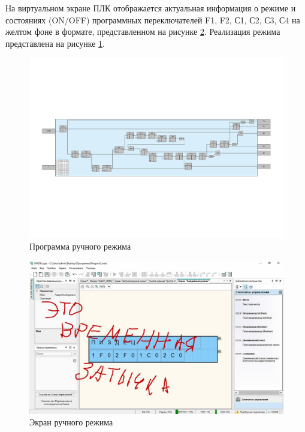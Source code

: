 На виртуальном экране ПЛК отображается актуальная информация о
режиме и состояниях (ON/OFF) программных переключателей F1, F2, С1, С2,
С3, С4 на желтом фоне в формате, представленном на рисунке \ref{fig:manual_screen}.
Реализация режима представлена на рисунке \ref{fig:manual_mode}.

\begin{figure}[pt]
    \centering
    \includegraphics[scale=0.5]{fig/auto_mode.pdf}
    \caption{Программа ручного режима}
    \label{fig:manual_mode}
\end{figure}

\begin{figure}[pb]
    \centering
    \includegraphics[scale=0.30]{fig/4.1.jpg}
    \caption{Экран ручного режима}
    \label{fig:manual_screen}
\end{figure}





%
%
%
